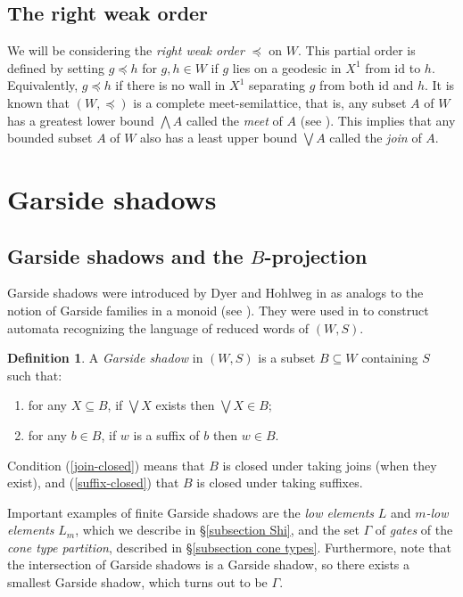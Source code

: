 \documentclass[a4paper,12pt,leqno]{amsart}
\theoremstyle{definition}
\newtheorem{defin}[theorem]{Definition}
\newcommand{\id}{\text{id}}
\begin{document}
\subsection{The right weak order} \label{The right weak order}

We will be considering the \emph{right weak order} $\preceq$ on $W$. This partial order is defined by setting $g \preceq h$ for $g,h \in W$ if $g$ lies on a geodesic in $X^1$ from $\id$ to $h$. Equivalently, $g \preceq h$ if there is no wall in $X^1$ separating $g$ from both $\id$ and $h$. It is known that $(W, \preceq)$ is a complete meet-semilattice, that is, any subset $A$ of $W$ has a greatest lower bound $\bigwedge A$ called the \emph{meet} of $A$ (see \cite[Thm 3.2.1]{B-meet}). This implies that any bounded subset $A$ of $W$ also has a least upper bound $\bigvee A$ called the \emph{join} of $A$.

\section{Garside shadows} \label{section Garside}

\subsection{Garside shadows and the $B$-projection}

Garside shadows were introduced by Dyer and Hohlweg in \cite{DH-Garside} as analogs to the notion of Garside families in a monoid (see \cite{D-monoid, DDH-monoid}). They were used in \cite{HNW-Gar} to construct automata recognizing the language of reduced words of $(W,S)$.

\begin{defin}
A \emph{Garside shadow} in $(W,S)$ is a subset $B \subseteq W$ containing $S$ such that:
\begin{enumerate}
    \item \label{join-closed} for any $X \subseteq B$, if $\bigvee X $ exists then $\bigvee X \in B$;
    \item \label{suffix-closed} for any $b \in B$, if $w$ is a suffix of $b$ then $w \in B$.
\end{enumerate}
Condition (\ref{join-closed}) means that $B$ is closed under taking joins (when they exist), and (\ref{suffix-closed}) that $B$ is closed under taking suffixes.
\end{defin}

Important examples of finite Garside shadows are the \emph{low elements} $L$ and $m$\emph{-low elements} $L_m$, which we describe in \S\ref{subsection Shi}, and the set $\Gamma$ of \emph{gates} of the \emph{cone type partition}, described in \S\ref{subsection cone types}. Furthermore, note that the intersection of Garside shadows is a Garside shadow, so there exists a smallest Garside shadow, which turns out to be $\Gamma$.
\end{document}
